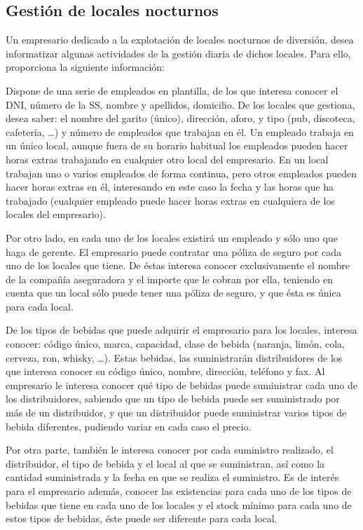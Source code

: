 \documentclass{db-practice}
\begin{document}
\subsection{Gestión de locales nocturnos}

Un empresario dedicado a la explotación de locales nocturnos de diversión, desea informatizar algunas actividades de la gestión diaria de dichos locales. Para ello, proporciona la siguiente información:

Dispone de una serie de empleados en plantilla, de los que interesa conocer el DNI, número de la SS, nombre y apellidos, domicilio. De los locales que gestiona, desea saber: el nombre del garito (único), dirección, aforo, y tipo (pub, discoteca, cafetería, \ldots) y número de empleados que trabajan en él. Un empleado trabaja en un único local, aunque fuera de su horario habitual los empleados pueden hacer horas extras trabajando en cualquier otro local del empresario. En un local trabajan uno o varios empleados de forma continua, pero otros empleados pueden hacer horas extras en él, interesando en este caso la fecha y las horas que ha trabajado (cualquier empleado puede hacer horas extras en cualquiera de los locales del empresario). 

Por otro lado, en cada uno de los locales existirá un empleado y sólo uno que haga de gerente. El empresario puede contratar una póliza de seguro por cada uno de los locales que tiene. De éstas interesa conocer exclusivamente el nombre de la compañía aseguradora y el importe que le cobran por ella, teniendo en cuenta que un local sólo puede tener una póliza de seguro, y que ésta es única para cada local.

De los tipos de bebidas que puede adquirir el empresario para los locales, interesa conocer: código único, marca, capacidad, clase de bebida (naranja, limón, cola, cerveza, ron, whisky, \ldots). Estas bebidas, las suministrarán distribuidores de los que interesa conocer su código único, nombre, dirección, teléfono y fax. Al empresario le interesa conocer qué tipo de bebidas puede suministrar cada uno de los distribuidores, sabiendo que un tipo de bebida puede ser suministrado por más de un distribuidor, y que un distribuidor puede suministrar varios tipos de bebida diferentes, pudiendo variar en cada caso el precio.

Por otra parte, también le interesa conocer por cada suministro realizado, el distribuidor, el tipo de bebida y el local al que se suministran, así como la cantidad suministrada y la fecha en que se realiza el suministro. Es de interés para el empresario además, conocer las existencias para cada uno de los tipos de bebidas que tiene en cada uno de los locales y el stock mínimo para cada uno de estos tipos de bebidas, éste puede ser diferente para cada local.
\end{document}

